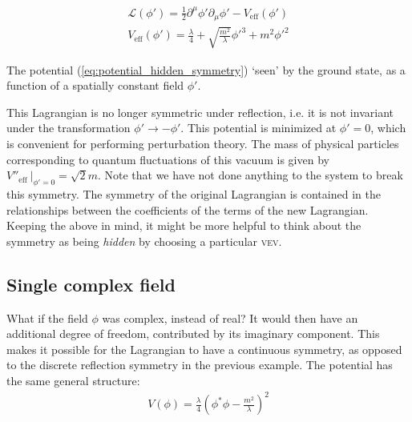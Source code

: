 \begin{align}
\mathcal{L}(\phi') = \frac{1}{2}\partial^\mu\phi'\partial_\mu\phi' - V_\text{eff}(\phi')\\
V_\text{eff}(\phi') = \frac{\lambda}{4} + \sqrt{\frac{m^2}{\lambda}}\phi'^3 + m^2\phi'^2
\label{eq:potential_hidden_symmetry}
\end{align}
\begin{marginfigure}
\caption{The potential (\autoref{eq:potential_hidden_symmetry}) `seen' by the ground state, as a function of a spatially constant field $\phi'$.}
\label{fig:hidden_symmetry}
\end{marginfigure}

This Lagrangian is no longer symmetric under reflection, i.e. it is not invariant under the transformation $\phi'\rightarrow -\phi'$. This potential is minimized at $\phi' = 0$, which is convenient for performing perturbation theory. The mass of physical particles corresponding to quantum fluctuations of this vacuum is given by $V''_\text{eff}~|_{\phi' = 0} = \sqrt{2}m$. Note that we have not done anything to the system to break this symmetry. The symmetry of the original Lagrangian is contained in the relationships between the coefficients of the terms of the new Lagrangian. Keeping the above in mind, it might be more helpful to think about the symmetry as being \emph{hidden} by choosing a particular \textsc{vev}.


\subsection{Single complex field}

What if the field $\phi$ was complex, instead of real? It would then have an additional degree of freedom, contributed by its imaginary component. This makes it possible for the Lagrangian to have a continuous symmetry, as opposed to the discrete reflection symmetry in the previous example. The potential has the same general structure:
\begin{align}
V(\phi) = \frac{\lambda}{4}\left(\phi^{*}\phi - \frac{m^2}{\lambda}\right)^2
\label{eq:single_complex_field_potential}
\end{align}

